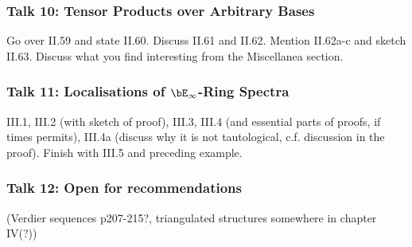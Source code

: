 \documentclass{article}
\begin{document}
\subsubsection*{Talk 10: Tensor Products over Arbitrary Bases}
Go over II.59 and state II.60. Discuss II.61 and II.62.
Mention II.62a-c and sketch II.63. Discuss what you find interesting
from the Miscellanea section.

\subsubsection*{Talk 11: Localisations of $\bE_\infty$-Ring Spectra}
III.1, III.2 (with sketch of proof), III.3, III.4 (and essential parts
of proofs, if times permits), III.4a (discuss why it is not tautological,
c.f. discussion in the proof). Finish with III.5 and preceding example.

\subsubsection*{Talk 12: Open for recommendations }
(Verdier sequences p207-215?, triangulated structures somewhere in chapter IV(?))

\printbibliography
\end{document}
